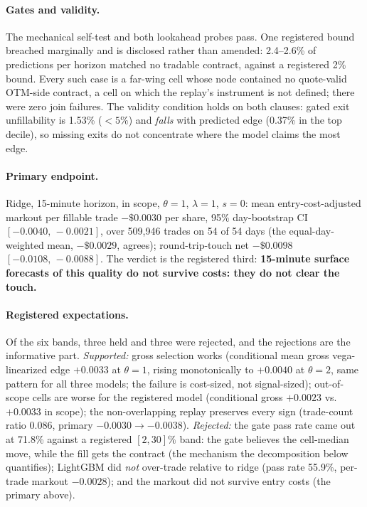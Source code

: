 \documentclass[11pt]{article}
\begin{document}
\paragraph{Gates and validity.} The mechanical self-test and both lookahead
probes pass. One registered bound breached marginally and is disclosed
rather than amended: 2.4--2.6\% of predictions per horizon matched no
tradable contract, against a registered 2\% bound. Every such case is a
far-wing cell whose node contained no quote-valid OTM-side contract, a
cell on which the replay's instrument is not defined; there were zero join
failures. The validity condition holds on both clauses: gated exit
unfillability is 1.53\% ($<5\%$) and \emph{falls} with predicted edge
(0.37\% in the top decile), so missing exits do not concentrate where the
model claims the most edge.

\paragraph{Primary endpoint.} Ridge, 15-minute horizon, in scope,
$\theta=1$, $\lambda=1$, $s=0$: mean entry-cost-adjusted markout per
fillable trade $\mathbf{-\$0.0030}$ per share, 95\% day-bootstrap CI
$[-0.0040,\,-0.0021]$, over 509{,}946 trades on 54 of 54 days (the
equal-day-weighted mean, $-\$0.0029$, agrees); round-trip-touch net
$-\$0.0098$ $[-0.0108,\,-0.0088]$. The verdict is the registered third:
\textbf{15-minute surface forecasts of this quality do not survive costs: they do not clear the touch.}

\paragraph{Registered expectations.} Of the six bands, three held and three
were rejected, and the rejections are the informative part.
\emph{Supported:} gross selection works (conditional mean gross
vega-linearized edge $+0.0033$ at $\theta=1$, rising monotonically to
$+0.0040$ at $\theta=2$, same pattern for all three models; the failure is cost-sized, not signal-sized); out-of-scope cells are worse for the
registered model (conditional gross $+0.0023$ vs.\ $+0.0033$ in scope);
the non-overlapping replay preserves every sign (trade-count ratio 0.086,
primary $-0.0030 \to -0.0038$). \emph{Rejected:} the gate pass rate came
out at 71.8\% against a registered $[2, 30]\%$ band: the gate believes
the cell-median move, while the fill gets the contract (the mechanism the
decomposition below quantifies); LightGBM did \emph{not} over-trade
relative to ridge (pass rate 55.9\%, per-trade markout $-0.0028$); and the
markout did not survive entry costs (the primary above).
\end{document}
